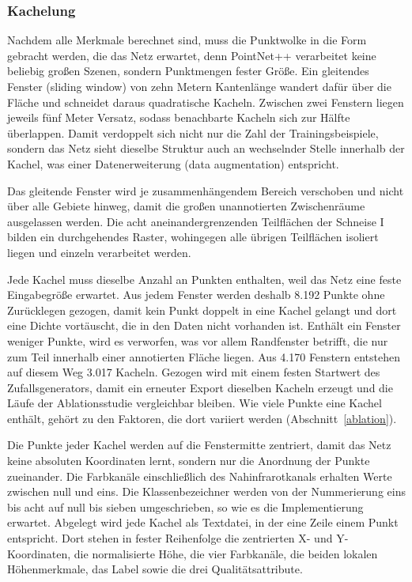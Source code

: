 \subsubsection{Kachelung}\label{tiling}

Nachdem alle Merkmale berechnet sind, muss die Punktwolke in die Form
gebracht werden, die das Netz erwartet, denn PointNet++ verarbeitet keine
beliebig großen Szenen, sondern Punktmengen fester Größe. Ein gleitendes
Fenster (sliding window) von zehn Metern Kantenlänge wandert dafür über die
Fläche und schneidet daraus quadratische Kacheln. Zwischen zwei Fenstern
liegen jeweils fünf Meter Versatz, sodass benachbarte Kacheln sich zur Hälfte
überlappen. Damit verdoppelt sich nicht nur die Zahl der Trainingsbeispiele, sondern das Netz sieht dieselbe Struktur auch an wechselnder Stelle innerhalb der Kachel, was einer Datenerweiterung (data augmentation) entspricht.

Das gleitende Fenster wird je zusammenhängendem Bereich verschoben und nicht über alle Gebiete hinweg, damit die großen unannotierten Zwischenräume ausgelassen werden. Die acht aneinandergrenzenden Teilflächen der Schneise I bilden ein durchgehendes Raster, wohingegen alle übrigen Teilflächen isoliert liegen und einzeln verarbeitet werden.

Jede Kachel muss dieselbe Anzahl an Punkten enthalten, weil das Netz eine feste Eingabegröße erwartet. Aus jedem Fenster werden deshalb 8.192 Punkte ohne Zurücklegen gezogen, damit kein Punkt doppelt in eine Kachel gelangt und dort eine Dichte vortäuscht, die in den Daten nicht vorhanden ist. Enthält ein Fenster weniger Punkte, wird es verworfen, was vor allem Randfenster betrifft, die nur zum Teil innerhalb einer annotierten Fläche liegen. Aus 4.170 Fenstern entstehen auf diesem Weg 3.017 Kacheln. Gezogen wird mit einem festen Startwert des Zufallsgenerators, damit ein erneuter Export dieselben Kacheln erzeugt und die Läufe der Ablationsstudie vergleichbar bleiben. Wie viele Punkte eine Kachel enthält, gehört zu den Faktoren, die dort variiert werden (Abschnitt~\ref{ablation}).

Die Punkte jeder Kachel werden auf die Fenstermitte zentriert, damit das Netz keine absoluten Koordinaten lernt, sondern nur die Anordnung der Punkte zueinander. Die Farbkanäle einschließlich des Nahinfrarotkanals erhalten Werte zwischen null und eins. Die Klassenbezeichner werden von der Nummerierung eins bis acht auf null bis sieben umgeschrieben, so wie es die Implementierung erwartet. Abgelegt wird jede Kachel als Textdatei, in der eine Zeile einem Punkt entspricht. Dort stehen in fester Reihenfolge die zentrierten X- und Y-Koordinaten, die normalisierte Höhe, die vier Farbkanäle, die beiden lokalen Höhenmerkmale, das Label sowie die drei Qualitätsattribute.

